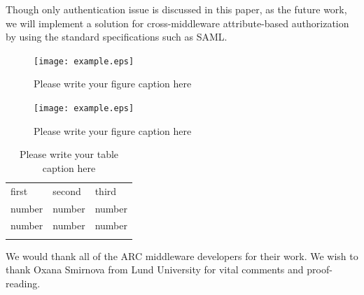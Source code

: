 Though only authentication issue is discussed in this paper, as the future work, we will implement a solution for cross-middleware attribute-based authorization by using the standard specifications such as SAML.




\begin{figure}
  \texttt{[image: example.eps]}
\caption{Please write your figure caption here}
\label{fig:1}       %
\end{figure}
%
\begin{figure}
  \texttt{[image: example.eps]}
\caption{Please write your figure caption here}
\label{fig:2}       %
\end{figure}
%
\begin{table}
\caption{Please write your table caption here}
\label{tab:1}       %
\begin{tabular}{lll}
\hline\noalign{\smallskip}
first & second & third  \\
\noalign{\smallskip}\hline\noalign{\smallskip}
number & number & number \\
number & number & number \\
\noalign{\smallskip}\hline
\end{tabular}
\end{table}


\begin{acknowledgements}
We would thank all of the ARC middleware developers for their work. We wish to thank Oxana Smirnova from Lund University for vital comments and proof-reading.
\end{acknowledgements}


